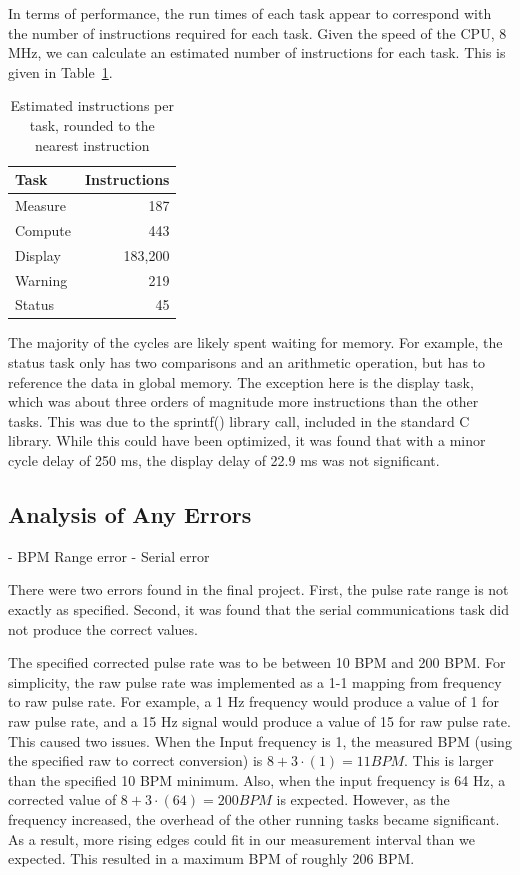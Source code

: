 \documentclass[12pt]{article} %
\begin{document}
    In terms of performance, the run times of each task appear to correspond with
    the number of instructions required for each task. Given the speed of the CPU,
    8 MHz, we can calculate an estimated number of instructions for each task.
    This is given in Table~\ref{tab:instr}.
    \begin{table}[h]
      \centering
      \begin{tabular}{|l|r|} 
	\hline
	Task & Instructions \\ \hline
	Measure & 187 \\ \hline
	Compute & 443 \\ \hline
	Display & 183,200 \\ \hline
	Warning & 219 \\ \hline
	Status & 45 \\ \hline
      \end{tabular}
      \caption{Estimated instructions per task, rounded to the nearest instruction}
      \label{tab:instr}
    \end{table}
    The majority of the cycles are likely spent waiting for memory. For example,
    the status task only has two comparisons and an arithmetic operation, but has
    to reference the data in global memory. The exception here is the display
    task, which was about three orders of magnitude more instructions than the
    other tasks. This was due to the sprintf() library call, included in the
    standard C library. While this could have been optimized, it was found that
    with a minor cycle delay of 250 ms, the display delay of 22.9 ms was not
    significant.


    \subsection{Analysis of Any Errors}

    - BPM Range error
    - Serial error
    
    There were two errors found in the final project.  First, the pulse rate
    range is not exactly as specified.  Second, it was found that the serial
    communications task did not produce the correct values.

    The specified corrected pulse rate was to be between 10 BPM and 200 BPM.
    For simplicity, the raw pulse rate was implemented as a 1-1 mapping from
    frequency to raw pulse rate.  For example, a 1 Hz frequency would produce a
    value of 1 for raw pulse rate, and a 15 Hz signal would produce a value of
    15 for raw pulse rate.  This caused two issues.  When the Input frequency
    is 1, the measured BPM (using the specified raw to correct conversion) is
    $8 + 3\cdot(1) = 11 BPM$.  This is larger than the specified 10 BPM
    minimum.  Also, when the input frequency is 64 Hz, a corrected value of 
    $8 + 3\cdot(64) = 200 BPM$ is expected.  However, as the frequency
    increased, the overhead of the other running tasks became significant.
    As a result, more rising edges could fit in our measurement interval
    than we expected.  This resulted in a maximum BPM of roughly 206 BPM.
\end{document}
